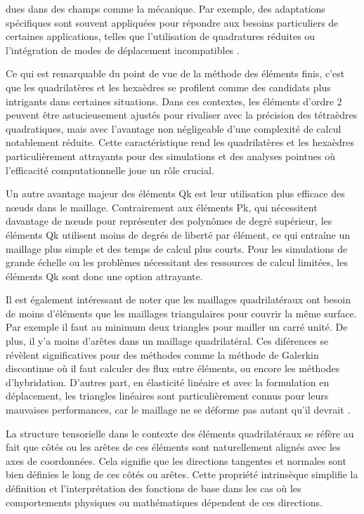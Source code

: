 dues dans des champs comme la mécanique. Par exemple, des adaptations spécifiques sont souvent appliquées pour répondre aux besoins particuliers de certaines applications, telles que l'utilisation de quadratures réduites ou l'intégration de modes de déplacement incompatibles \cite{reberol2018maillages}.

Ce qui est remarquable du point de vue de la méthode des éléments finis, c'est que les quadrilatères et les hexaèdres se profilent comme des candidats plus intrigants dans certaines situations. Dans ces contextes, les éléments d'ordre 2 peuvent être astucieusement ajustés pour rivaliser avec la précision des tétraèdres quadratiques, mais avec l'avantage non négligeable d'une complexité de calcul notablement réduite. Cette caractéristique rend les quadrilatères et les hexaèdres particulièrement attrayants pour des simulations et des analyses pointues où l'efficacité computationnelle joue un rôle crucial.

Un autre avantage majeur des éléments Qk est leur utilisation plus efficace des nœuds dans le maillage. Contrairement aux éléments Pk, qui nécessitent davantage de nœuds pour représenter des polynômes de degré supérieur, les éléments Qk utilisent moins de degrés de liberté par élément, ce qui entraîne un maillage plus simple et des temps de calcul plus courts. Pour les simulations de grande échelle ou les problèmes nécessitant des ressources de calcul limitées, les éléments Qk sont donc une option attrayante.

Il est également intéressant de noter que les maillages quadrilatéraux ont besoin de moins d’éléments que les maillages triangulaires pour couvrir la même surface. Par exemple il faut au minimum deux triangles pour mailler un carré unité. De plus, il y'a moins d'arêtes dans un maillage quadrilatéral. Ces diférences se révèlent significatives pour des méthodes comme la méthode de Galerkin discontinue où il faut calculer des flux entre éléments, ou encore les méthodes d’hybridation. D'autres part, en élasticité linéaire et avec la formulation en déplacement, les triangles linéaires sont particulièrement connus pour leurs mauvaises performances, car le maillage ne se déforme pas autant qu'il devrait \cite{reberol2018maillages}.

 La structure tensorielle dans le contexte des éléments quadrilatéraux se réfère au fait que côtés ou les arêtes de ces éléments sont naturellement alignés avec les axes de coordonnées. Cela signifie que les directions tangentes et normales sont bien définies le long de ces côtés ou arêtes. Cette propriété intrinsèque simplifie la définition et l'interprétation des fonctions de base dans les cas où les comportements physiques ou mathématiques dépendent de ces directions.

